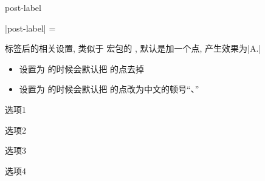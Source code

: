\documentclass{xdyy-usermanual}
\begin{document}
\begin{function}{post-label}
  \begin{syntax}
    |post-label| =  
  \end{syntax}
  标签后的相关设置, 类似于  宏包的 , 默认是加一个点, 产生效果为|A.|
  \begin{itemize}
    \item {} 设置为  的时候会默认把 的点去掉
    \item {} 设置为  的时候会默认把 的点改为中文的顿号“、”
  \end{itemize}
\end{function}
\begin{vexample}
    \begin{xchoices}[post-label = {)}]
      \item 选项1
      \item 选项2
      \item 选项3
      \item 选项4
    \end{xchoices}
\end{vexample}


\subsubsection{  }
\end{document}
